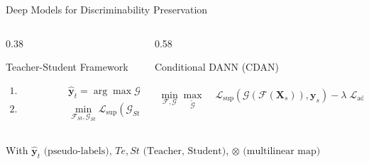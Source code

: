 \documentclass[aspectratio=169]{beamer}
\providecommand{\mat}[1]{{\bm{#1}}}
\providecommand{\ve}[1]{{\bm{#1}}}
\begin{document}
\begin{frame}{Deep Models for Discriminability Preservation}
    \begin{columns}[T]
    \footnotesize
        \begin{column}{0.38\textwidth}
            \begin{block}{Teacher-Student Framework}
                \begin{minipage}{\linewidth}
                \begin{align*}
                    \text{1. Teacher: } & \quad \hat{\ve{y}}_t = \arg\max \mathcal{G}_{Te}(\mathcal{F}_{Te}(\ve{X}_t)) \\[.5em]
                    \text{2. Student: }   & \quad \min_{\mathcal{F}_{St}, \mathcal{G}_{St}} \mathcal{L}_{\mathrm{sup}}(\mathcal{G}_{St}(\mathcal{F}_{St}(\ve{X}_t)), \hat{\ve{y}}_t)
                \end{align*}
                \end{minipage}
            \end{block}
        \end{column}
        
        \hfill %
        
        \begin{column}{0.58\textwidth}
    \begin{block}{Conditional DANN (CDAN)}
        \begin{minipage}{\linewidth}
        \begin{align*}
            \min_{\mathcal{F}, \mathcal{G}} \max_{\tilde{\mathcal{G}}} \; & \mathcal{L}_{\mathrm{sup}}(\mathcal{G}(\mathcal{F}(\ve{X}_s)), \ve{y}_s) - \lambda\; \mathcal{L}_{\mathrm{adv}}\left(\tilde{\mathcal{G}}(\mathcal{F}(\mat{X}) \otimes \mathcal{G}(\mathcal{F}(\mat{X})))\right)
        \end{align*}
        \vfill 
        \end{minipage}
    \end{block}
\end{column}
    \end{columns}

    \vspace{1cm}
    \footnotesize
    With $\hat{\ve{y}}_t \text{ (pseudo-labels)}$, $Te, St \text{ (Teacher, Student)}$, $\otimes \text{ (multilinear map)}$

\end{frame}
\end{document}
